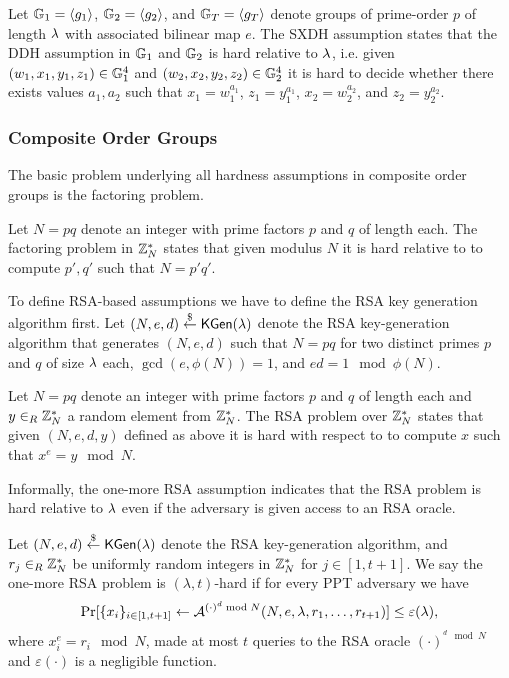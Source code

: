 \begin{definition}\label{def:sxdh}
Let $\GG_1=\genG[1]$, $\GG_2=\genG[2]$, and $\GG_T=\genG[T]$ denote groups of prime-order $p$ of length $\secpar$ with associated bilinear map $e$.
The \ac{SXDH} assumption states that the DDH assumption in $\GG_1$ and $\GG_2$ is hard relative to $\secpar$, i.e. given $(w_1,x_1,y_1,z_1)\in\GG^4_1$ and $(w_2,x_2,y_2,z_2)\in\GG^4_2$ it is hard to decide whether there exists values $a_1,a_2$ such that $x_1=w_1^{a_1}$, $z_1=y_1^{a_1}$, $x_2=w_2^{a_2}$, and $z_2=y_2^{a_2}$.
\eod
\end{definition}

\subsubsection{Composite Order Groups}
The basic problem underlying all hardness assumptions in composite order groups is the factoring problem.

\begin{definition}\label{def:factoring}
Let $N=pq$ denote an integer with prime factors $p$ and $q$ of length \secpar each.
The factoring problem in $\ZZ^\ast_N$ states that given modulus $N$ it is hard relative to \secpar to compute $p',q'$ such that $N=p'q'$.
\eod
\end{definition}

\noindent
To define RSA-based assumptions we have to define the RSA key generation algorithm first.
Let $(N, e, d)\ralgout\KGen(\secpar)$ denote the RSA key-generation algorithm that generates $(N, e, d)$ such that $N=pq$ for two distinct primes $p$ and $q$ of size $\secpar$ each, $\gcd(e, \phi(N))=1$, and $ed=1\mod \phi(N)$.

\begin{definition}\label{def:rsa}
Let $N=pq$ denote an integer with prime factors $p$ and $q$ of length \secpar each and $y\rin\ZZ^\ast_N$ a random element from $\ZZ^\ast_N$.
The RSA problem over $\ZZ^\ast_N$ states that given $(N,e,d,y)$ defined as above it is hard with respect to \secpar to compute $x$ such that $x^e = y \mod N$.
\eod
\end{definition}

\noindent
Informally, the one-more RSA assumption indicates that the RSA problem is hard relative to $\secpar$ even if the adversary is given access to an RSA oracle.

\begin{definition}\label{def:onemoreRSA}
Let $(N, e, d)\ralgout\KGen(\lambda)$ denote the RSA key-generation algorithm, and $r_j\rin\ZZ^\ast_N$ be uniformly random integers in $\ZZ^\ast_N$ for $j\in[1,t+1]$.
We say the one-more RSA problem is $(\lambda, t)$-hard if for every \ac{PPT} adversary \cA we have
\[ \Pr[\{x_i\}_{i\in[1,t+1]} \gets \cA^{(\cdot)^d \bmod N}(N, e, \lambda, r_1, \dots, r_{t+1})] \leq \varepsilon(\secpar), \]
where $x_i^e=r_i\mod N$, \cA made at most $t$ queries to the RSA oracle $(\cdot)^{^d \mod N}$ and $\varepsilon(\cdot)$ is a negligible function.
\eod
\end{definition}


